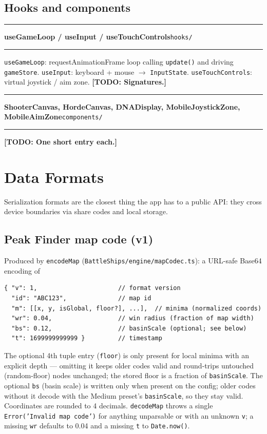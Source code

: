 \documentclass[11pt,a4paper]{report}
\newcommand{\todo}[1]{\textcolor{red!70!black}{\textbf{[TODO: #1]}}}
\newcommand{\srcfile}[1]{\texttt{\small #1}}   %
\newcommand{\ts}[1]{\texttt{#1}}               %
\newenvironment{apientry}[2]{%
  \par\medskip\noindent
  \begin{minipage}{\textwidth}
  \hrule\vspace{0.6ex}
  {\large\ttfamily\bfseries #1}\hfill{\footnotesize\srcfile{#2}}
  \vspace{0.4ex}\hrule\medskip
}{%
  \end{minipage}\par\medskip
}
\begin{document}
\section{Hooks and components}

\begin{apientry}{useGameLoop / useInput / useTouchControls}{hooks/}
\ts{useGameLoop}: requestAnimationFrame loop calling \ts{update()} and
driving \ts{gameStore}. \ts{useInput}: keyboard + mouse $\to$
\ts{InputState}. \ts{useTouchControls}: virtual joystick / aim zone.
\todo{Signatures.}
\end{apientry}

\begin{apientry}{ShooterCanvas, HordeCanvas, DNADisplay,
MobileJoystickZone, MobileAimZone}{components/}
\todo{One short entry each.}
\end{apientry}

\chapter{Data Formats}
\label{ch:api-formats}

Serialization formats are the closest thing the app has to a public API:
they cross device boundaries via share codes and local storage.

\section{Peak Finder map code (v1)}

Produced by \ts{encodeMap} (\srcfile{BattleShips/engine/mapCodec.ts}):
a URL-safe Base64 encoding of

\begin{lstlisting}
{ "v": 1,                      // format version
  "id": "ABC123",              // map id
  "m": [[x, y, isGlobal, floor?], ...],  // minima (normalized coords)
  "wr": 0.04,                  // win radius (fraction of map width)
  "bs": 0.12,                  // basinScale (optional; see below)
  "t": 1699999999999 }         // timestamp
\end{lstlisting}

The optional 4th tuple entry (\ts{floor}) is only present for local minima
with an explicit depth --- omitting it keeps older codes valid and
round-trips untouched (random-floor) nodes unchanged; the stored floor is a
fraction of \ts{basinScale}. The optional \ts{bs} (basin scale) is written
only when present on the config; older codes without it decode with the
Medium preset's \ts{basinScale}, so they stay valid. Coordinates are
rounded to 4 decimals. \ts{decodeMap} throws a single
\ts{Error('Invalid map code')} for anything unparsable or with an unknown
\ts{v}; a missing \ts{wr} defaults to 0.04 and a missing \ts{t} to
\ts{Date.now()}.
\end{document}
